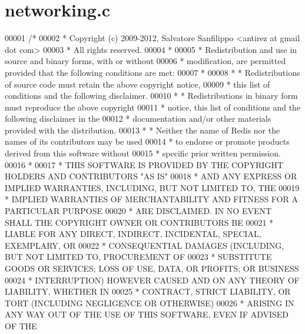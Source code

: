 \hypertarget{networking_8c_source}{}\section{networking.\+c}
\label{networking_8c_source}

\begin{DoxyCode}
00001 \textcolor{comment}{/*}
00002 \textcolor{comment}{ * Copyright (c) 2009-2012, Salvatore Sanfilippo <antirez at gmail dot com>}
00003 \textcolor{comment}{ * All rights reserved.}
00004 \textcolor{comment}{ *}
00005 \textcolor{comment}{ * Redistribution and use in source and binary forms, with or without}
00006 \textcolor{comment}{ * modification, are permitted provided that the following conditions are met:}
00007 \textcolor{comment}{ *}
00008 \textcolor{comment}{ *   * Redistributions of source code must retain the above copyright notice,}
00009 \textcolor{comment}{ *     this list of conditions and the following disclaimer.}
00010 \textcolor{comment}{ *   * Redistributions in binary form must reproduce the above copyright}
00011 \textcolor{comment}{ *     notice, this list of conditions and the following disclaimer in the}
00012 \textcolor{comment}{ *     documentation and/or other materials provided with the distribution.}
00013 \textcolor{comment}{ *   * Neither the name of Redis nor the names of its contributors may be used}
00014 \textcolor{comment}{ *     to endorse or promote products derived from this software without}
00015 \textcolor{comment}{ *     specific prior written permission.}
00016 \textcolor{comment}{ *}
00017 \textcolor{comment}{ * THIS SOFTWARE IS PROVIDED BY THE COPYRIGHT HOLDERS AND CONTRIBUTORS "AS IS"}
00018 \textcolor{comment}{ * AND ANY EXPRESS OR IMPLIED WARRANTIES, INCLUDING, BUT NOT LIMITED TO, THE}
00019 \textcolor{comment}{ * IMPLIED WARRANTIES OF MERCHANTABILITY AND FITNESS FOR A PARTICULAR PURPOSE}
00020 \textcolor{comment}{ * ARE DISCLAIMED. IN NO EVENT SHALL THE COPYRIGHT OWNER OR CONTRIBUTORS BE}
00021 \textcolor{comment}{ * LIABLE FOR ANY DIRECT, INDIRECT, INCIDENTAL, SPECIAL, EXEMPLARY, OR}
00022 \textcolor{comment}{ * CONSEQUENTIAL DAMAGES (INCLUDING, BUT NOT LIMITED TO, PROCUREMENT OF}
00023 \textcolor{comment}{ * SUBSTITUTE GOODS OR SERVICES; LOSS OF USE, DATA, OR PROFITS; OR BUSINESS}
00024 \textcolor{comment}{ * INTERRUPTION) HOWEVER CAUSED AND ON ANY THEORY OF LIABILITY, WHETHER IN}
00025 \textcolor{comment}{ * CONTRACT, STRICT LIABILITY, OR TORT (INCLUDING NEGLIGENCE OR OTHERWISE)}
00026 \textcolor{comment}{ * ARISING IN ANY WAY OUT OF THE USE OF THIS SOFTWARE, EVEN IF ADVISED OF THE}

\end{DoxyCode}
